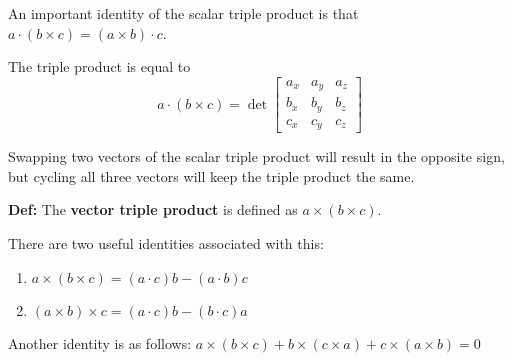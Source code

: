 \documentclass{article}
\begin{document}
An important identity of the scalar triple product is that $a \cdot (b\times c) = (a \times b) \cdot c$. 

The triple product is equal to$$a \cdot (b\times c) = \det \begin{bmatrix}
    a_x & a_y & a_z \\
    b_x & b_y & b_z \\ 
    c_x & c_y & c_z
\end{bmatrix}$$

Swapping two vectors of the scalar triple product will result in the opposite sign, but cycling all three vectors will keep the triple product the same. 

\textbf{Def:} The \textbf{vector triple product} is defined as $a \times (b\times c)$.

There are two useful identities associated with this:
\begin{enumerate}
    \item $a\times (b\times c) = (a\cdot c)b- (a\cdot b)c$
    \item $(a\times b)\times c = (a\cdot c)b - (b\cdot c)a$
\end{enumerate}

Another identity is as follows: $a \times (b\times c) + b \times (c\times a) + c\times (a\times b) = 0$
\end{document}
